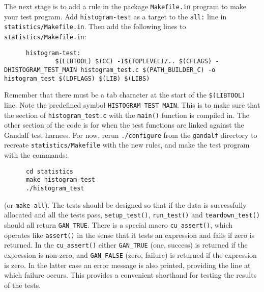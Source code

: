 The next stage is to add a rule in the package {\tt Makefile.in} program to
make your test program. Add {\tt histogram-test} as a target to the
{\tt all:} line in {\tt statistics/Makefile.in}. Then add the following lines
to {\tt statistics/Makefile.in}:
\begin{verbatim}
      histogram-test:
              $(LIBTOOL) $(CC) -I$(TOPLEVEL)/.. $(CFLAGS) -DHISTOGRAM_TEST_MAIN histogram_test.c $(PATH_BUILDER_C) -o histogram_test $(LDFLAGS) $(LIB) $(LIBS)
\end{verbatim}
Remember that there must be a tab character at the start of the
{\tt \$(LIBTOOL)} line. Note the predefined symbol {\tt HISTOGRAM\_TEST\_MAIN}.
This is to make sure that the section of {\tt histogram\_test.c} with the
{\tt main()} function is compiled in. The other section of the code is
for when the test functions are linked against the Gandalf test harness.
For now, rerun {\tt ./configure} from the {\tt gandalf} directory to
recreate {\tt statistics/Makefile} with the new rules, and make the
test program with the commands:
\begin{verbatim}
      cd statistics
      make histogram-test
      ./histogram_test
\end{verbatim}
(or {\tt make all}). The tests should be designed so that if the data is
successfully allocated and all the tests pass, {\tt setup\_test()},
{\tt run\_test()} and {\tt teardown\_test()} should all return {\tt GAN\_TRUE}.
There is a special macro {\tt cu\_assert()}, which operates like {\tt assert()}
in the sense that it tests an expression and fails if zero is returned.
In the {\tt cu\_assert()} either {\tt GAN\_TRUE} (one, success) is returned
if the expression is non-zero, and {\tt GAN\_FALSE} (zero, failure) is returned
if the expression is zero. In the latter case an error message is also
printed, providing the line at which failure occurs. This provides a
convenient shorthand for testing the results of the tests.

